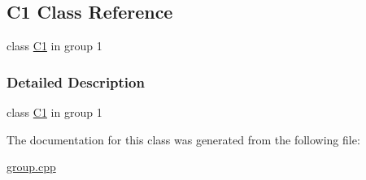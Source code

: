 \hypertarget{class_c1}{}\subsection{C1 Class Reference}
\label{class_c1}


class \mbox{\hyperlink{class_c1}{C1}} in group 1  




\subsubsection{Detailed Description}
class \mbox{\hyperlink{class_c1}{C1}} in group 1 

The documentation for this class was generated from the following file\+:\begin{DoxyCompactItemize}
\item 
\mbox{\hyperlink{group_8cpp}{group.\+cpp}}\end{DoxyCompactItemize}
